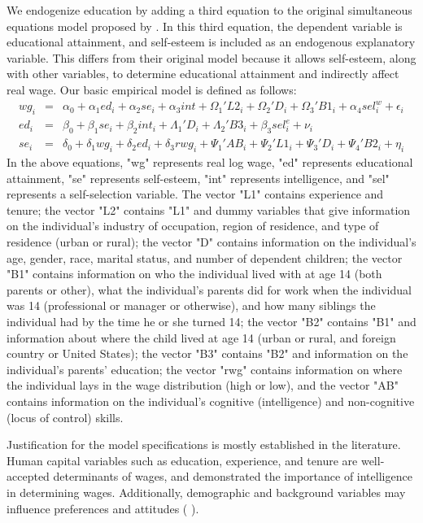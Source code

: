 \documentclass[12pt]{report}
\newcommand{\citee}[1]{\citename{#1} \citeyear{#1}}
\begin{document}
We endogenize education by adding a third equation to the original simultaneous equations model proposed by \citee{GVD1997}. In this third equation, the dependent variable is educational attainment, and self-esteem is included as an endogenous explanatory variable. This differs from their original model because it allows self-esteem, along with other variables, to determine educational attainment and indirectly affect real wage. Our basic empirical model is defined as follows:
\begin{eqnarray}
wg_i & = & \alpha_0 + \alpha_1 ed_i + \alpha_2 se_i + \alpha_3 int + \Omega_1' L2_i + \Omega_2' D_i + \Omega_3' B1_i + \alpha_4 sel_i^w + \epsilon_i \\
ed_i & = & \beta_0 + \beta_1 se_i + \beta_2 int_i + \Lambda_1' D_i + \Lambda_2' B3_i + \beta_3 sel_i^e + \nu_i \\
se_i & = & \delta_0 + \delta_1 wg_i + \delta_2 ed_i + \delta_3 rwg_i  + \Psi_1' AB_i + \Psi_2' L1_i + \Psi_3' D_i + \Psi_4' B2_i + \eta_i
\end{eqnarray}
In the above equations, "wg" represents real log wage, "ed" represents educational attainment, "se" represents self-esteem, "int" represents intelligence, and "sel" represents a self-selection variable. The vector "L1" contains experience and tenure; the vector "L2" contains "L1" and dummy variables that give information on the individual's industry of occupation, region of residence, and type of residence (urban or rural); the vector "D" contains information on the individual's age, gender, race, marital status, and number of dependent children; the vector "B1" contains information on who the individual lived with at age 14 (both parents or other), what the individual's parents did for work when the individual was 14 (professional or manager or otherwise), and how many siblings the individual had by the time he or she turned 14; the vector "B2" contains "B1" and information about where the child lived at age 14 (urban or rural, and foreign country or United States); the vector "B3" contains "B2" and information on the individual's parents' education; the vector "rwg" contains information on where the individual lays in the wage distribution (high or low), and the vector "AB" contains information on the individual's cognitive (intelligence) and non-cognitive (locus of control) skills.

Justification for the model specifications is mostly established in the literature. Human capital variables such as education, experience, and tenure are well-accepted determinants of wages, and \citee{HM1994} demonstrated the importance of intelligence in determining wages. Additionally, demographic and background variables may influence preferences and attitudes (\citee{GVD1997}).
\end{document}
